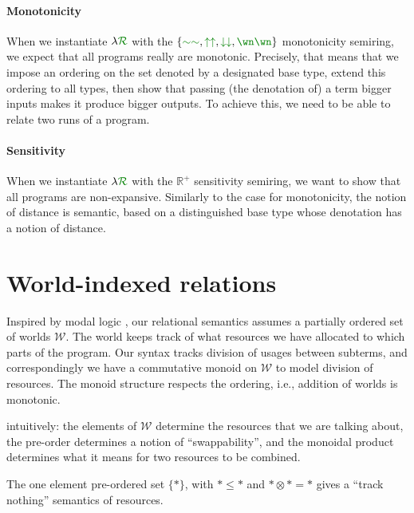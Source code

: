 \paragraph{Monotonicity}
When we instantiate $\name$ with the $\{\gr{\sim\sim}, \gr{\uparrow\uparrow},
\gr{\downarrow\downarrow}, \gr{\wn\wn}\}$ monotonicity semiring, we expect that
all programs really are monotonic.
Precisely, that means that we impose an ordering on the set denoted by a
designated base type, extend this ordering to all types, then show that passing
(the denotation of) a term bigger inputs makes it produce bigger outputs.
To achieve this, we need to be able to relate two runs of a program.

\paragraph{Sensitivity}
When we instantiate $\name$ with the $\mathbb R^+$ sensitivity semiring, we want
to show that all programs are non-expansive.
Similarly to the case for monotonicity, the notion of distance is semantic,
based on a distinguished base type whose denotation has a notion of distance.

\section{World-indexed relations}

Inspired by modal logic , our relational semantics assumes a partially
ordered set of worlds $\mathcal W$.
The world keeps track of what resources we have allocated to which parts of the
program.
Our syntax tracks division of usages between subterms, and correspondingly we
have a commutative monoid on $\mathcal W$ to model division of resources.
The monoid structure respects the ordering, i.e., addition of worlds is
monotonic.

{\color{red}intuitively: the elements of $\mathcal W$ determine the
  resources that we are talking about, the pre-order determines a
  notion of ``swappability'', and the monoidal product determines what
  it means for two resources to be combined.}

\begin{example}[Trivial]\label{def:trivial-worlds}
  The one element pre-ordered set $\{*\}$, with ${*} \leq {*}$ and
  ${*} \otimes {*} = {*}$ gives a ``track nothing'' semantics of
  resources. 
\end{example}

\newcommand{\append}{\mathop{++}}

